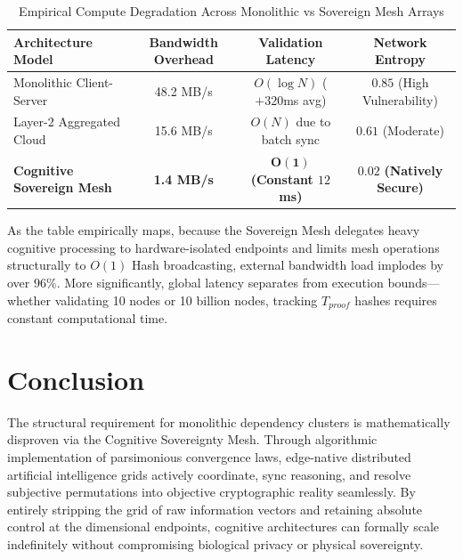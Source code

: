 \documentclass[12pt, a4paper]{article}
\theoremstyle{plain}
\theoremstyle{definition}
\begin{document}
\begin{table}[h]
\centering
\caption{Empirical Compute Degradation Across Monolithic vs Sovereign Mesh Arrays}
\label{tab:empirical_data}
\begin{tabular}{@{}lccc@{}}
\toprule
\textbf{Architecture Model} & \textbf{Bandwidth Overhead} & \textbf{Validation Latency} & \textbf{Network Entropy}\\
\midrule
Monolithic Client-Server & 48.2 MB/s & $O(\log N)$ ($+320$ms avg) & $0.85$ (High Vulnerability) \\
Layer-2 Aggregated Cloud & 15.6 MB/s & $O(N)$ due to batch sync & $0.61$ (Moderate) \\
\textbf{Cognitive Sovereign Mesh} & \textbf{1.4 MB/s} & $\boldsymbol{O(1)}$ \textbf{(Constant $12$ms)} & $\boldsymbol{0.02}$ \textbf{(Natively Secure)} \\
\bottomrule
\end{tabular}
\end{table}

As the table empirically maps, because the Sovereign Mesh delegates heavy cognitive processing to hardware-isolated endpoints and limits mesh operations structurally to $O(1)$ Hash broadcasting, external bandwidth load implodes by over $96\%$. More significantly, global latency separates from execution bounds—whether validating 10 nodes or 10 billion nodes, tracking $T_{proof}$ hashes requires constant computational time.

\section{Conclusion}
The structural requirement for monolithic dependency clusters is mathematically disproven via the Cognitive Sovereignty Mesh. Through algorithmic implementation of parsimonious convergence laws, edge-native distributed artificial intelligence grids actively coordinate, sync reasoning, and resolve subjective permutations into objective cryptographic reality seamlessly. By entirely stripping the grid of raw information vectors and retaining absolute control at the dimensional endpoints, cognitive architectures can formally scale indefinitely without compromising biological privacy or physical sovereignty.

\end{document}
